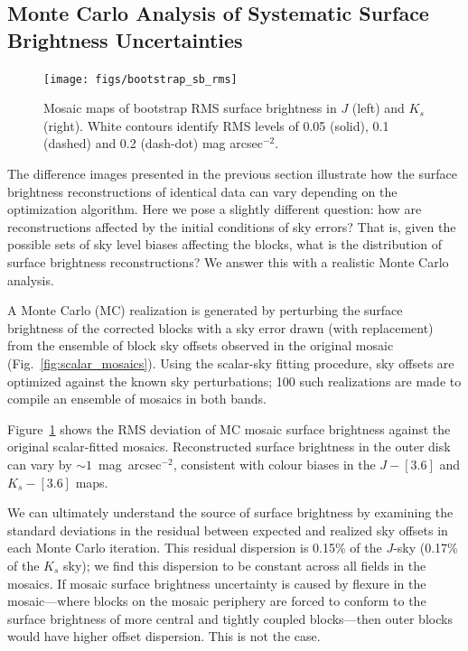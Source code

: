 \documentclass[iop]{emulateapj}
\newcommand{\Fig}[1]{Fig.~\ref{fig:#1}}  %
\begin{document}
\subsection{Monte Carlo Analysis of Systematic Surface Brightness Uncertainties}
\label{sec:montecarlo}

\begin{figure}[t]
\centering
\texttt{[image: figs/bootstrap\_sb\_rms]}
\caption{Mosaic maps of bootstrap RMS surface brightness in $J$ (left) and $K_s$ (right).
White contours identify RMS levels of 0.05 (solid), 0.1 (dashed) and 0.2 (dash-dot) mag arcsec$^{-2}$.}
\label{fig:bootstrap_sb_rms}
\end{figure}

The difference images presented in the previous section illustrate how the surface brightness reconstructions of identical data can vary depending on the optimization algorithm.
Here we pose a slightly different question: how are reconstructions affected by the initial conditions of sky errors?
That is, given the possible sets of sky level biases affecting the blocks, what is the distribution of surface brightness reconstructions?
We answer this with a realistic Monte Carlo analysis.

A Monte Carlo (MC) realization is generated by perturbing the surface brightness of the corrected blocks with a sky error drawn (with replacement) from the ensemble of block sky offsets observed in the original mosaic (\Fig{scalar_mosaics}).
Using the scalar-sky fitting procedure, sky offsets  are optimized against the known sky perturbations; 100 such realizations are made to compile an ensemble of mosaics in both bands.

Figure~\ref{fig:bootstrap_sb_rms} shows the RMS deviation of MC mosaic surface brightness against the original scalar-fitted mosaics.
Reconstructed surface brightness in the outer disk can vary by $\sim 1$~mag~arcsec$^{-2}$, consistent with colour biases in the $J-[3.6]$ and $K_s-[3.6]$ maps.

We can ultimately understand the source of surface brightness by examining the standard deviations in the residual between expected and realized sky offsets in each Monte Carlo iteration.
This residual dispersion is 0.15\% of the $J$-sky (0.17\% of the $K_s$ sky); we find this dispersion to be constant across all fields in the mosaics.
If mosaic surface brightness uncertainty is caused by flexure in the mosaic---where blocks on the mosaic periphery are forced to conform to the surface brightness of more central and tightly coupled blocks---then outer blocks would have higher offset dispersion.
This is not the case.
\end{document}
